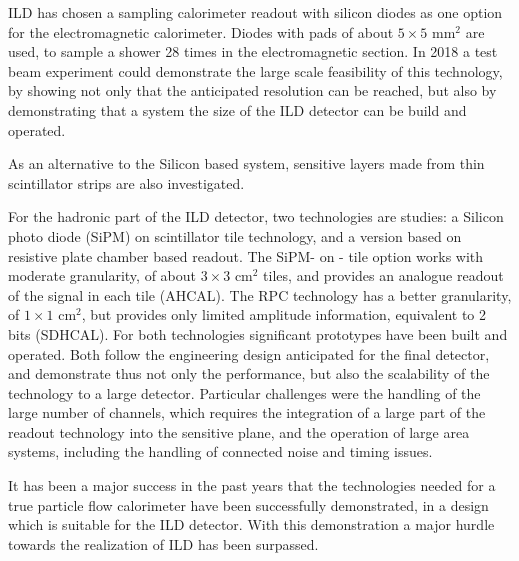 \documentclass[%
 amsmath,amssymb,
 aps,
]{revtex4-1}
\begin{document}
ILD has chosen a sampling calorimeter readout with silicon diodes as one option for the electromagnetic calorimeter. Diodes with pads of about $5 \times 5$ mm$^2$ are used, to sample a shower 28 times in the electromagnetic section. In 2018 a test beam experiment could demonstrate the large scale feasibility of this technology, by showing not only that the anticipated resolution can be reached, but also by demonstrating that a system the size of the ILD detector can be build and operated. 

As an alternative to the Silicon based system, sensitive layers made from thin scintillator strips are also investigated. 

For the hadronic part of the ILD detector, two technologies are studies: a Silicon photo diode (SiPM) on scintillator tile technology, and a version based on resistive plate chamber based readout. The SiPM- on - tile option works with moderate granularity, of about $3 \times 3$ cm$^2$ tiles, and provides an analogue readout of the signal in each tile (AHCAL). The RPC technology has a better granularity, of $1 \times 1$ cm$^2$, but provides only limited amplitude information, equivalent to 2 bits (SDHCAL). For both technologies significant prototypes have been built and operated. Both follow the engineering design anticipated for the final detector, and demonstrate thus not only the performance, but also the scalability of the technology to a large detector. Particular challenges were the handling of the large number of channels, which requires the integration of a large part of the readout technology into the sensitive plane, and the operation of large area systems, including the handling of connected noise and timing issues. 

It has been a major success in the past years that the technologies needed for a true particle flow calorimeter have been successfully demonstrated, in a design which is suitable for the ILD detector. With this demonstration a major hurdle towards the realization of ILD has been surpassed. 
\end{document}
